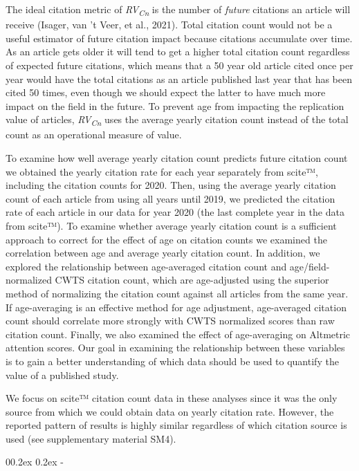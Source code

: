 \documentclass[
  man,floatsintext]{apa6}
\makeatletter
\let\oldsubparagraph\subparagraph
\renewcommand{\subparagraph}[1]{\oldsubparagraph{#1}\mbox{}}
\renewcommand{\subparagraph}[1]{\@startsection{subparagraph}{5}{1em}%
  {0\baselineskip \@plus 0.2ex \@minus 0.2ex}%
  {-\z@\relax}%
  {\normalfont\normalsize\itshape\hspace{\parindent}{#1}\textit{\addperi}}{\relax}}
\makeatother
\begin{document}
The ideal citation metric of \emph{RV\textsubscript{Cn}} is the number of \emph{future} citations an article will receive (Isager, van 't Veer, et al., 2021). Total citation count would not be a useful estimator of future citation impact because citations accumulate over time. As an article gets older it will tend to get a higher total citation count regardless of expected future citations, which means that a 50 year old article cited once per year would have the total citations as an article published last year that has been cited 50 times, even though we should expect the latter to have much more impact on the field in the future. To prevent age from impacting the replication value of articles, \emph{RV\textsubscript{Cn}} uses the average yearly citation count instead of the total count as an operational measure of value.

To examine how well average yearly citation count predicts future citation count we obtained the yearly citation rate for each year separately from scite™, including the citation counts for 2020. Then, using the average yearly citation count of each article from using all years until 2019, we predicted the citation rate of each article in our data for year 2020 (the last complete year in the data from scite™). To examine whether average yearly citation count is a sufficient approach to correct for the effect of age on citation counts we examined the correlation between age and average yearly citation count. In addition, we explored the relationship between age-averaged citation count and age/field-normalized CWTS citation count, which are age-adjusted using the superior method of normalizing the citation count against all articles from the same year. If age-averaging is an effective method for age adjustment, age-averaged citation count should correlate more strongly with CWTS normalized scores than raw citation count. Finally, we also examined the effect of age-averaging on Altmetric attention scores. Our goal in examining the relationship between these variables is to gain a better understanding of which data should be used to quantify the value of a published study.

We focus on scite™ citation count data in these analyses since it was the only source from which we could obtain data on yearly citation rate. However, the reported pattern of results is highly similar regardless of which citation source is used (see supplementary material SM4).

\hypertarget{predictive-accuracy}{%
\subparagraph{Predictive accuracy}\label{predictive-accuracy}}
\end{document}
